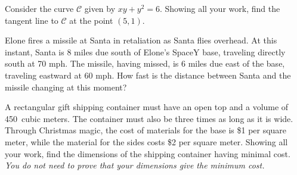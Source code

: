 \documentclass[12pt,letterpaper]{exam}
\begin{document}
\begin{questions}
\newpage
{} \par\vspace{0.3cm}

Consider the curve $\mathcal{C}$ given by $xy + y^2= 6$. Showing all your work, find the tangent line to $\mathcal{C}$ at the point $(5, 1)$.



\newpage
{} \par\vspace{0.3cm}

Elone fires a missile at Santa in retaliation as Santa flies overhead. At this instant, Santa is 8 miles due south of Elone’s SpaceY base, traveling directly south at 70 mph. The missile, having missed, is 6 miles due east of the base, traveling eastward at 60 mph. How fast is the distance between Santa and the missile changing at this moment?



\newpage
{} \par\vspace{0.3cm}

A rectangular gift shipping container must have an open top and a volume of 450~cubic meters. The container must also be three times as long as it is wide. Through Christmas magic, the cost of materials for the base is \$1 per square meter, while the material for the sides costs \$2 per square meter. Showing all your work, find the dimensions of the shipping container having minimal cost. {\itshape You do not need to prove that your dimensions give the minimum cost.}



\newpage
{} \par\vspace{0.3cm}


\end{questions}
\end{document}
